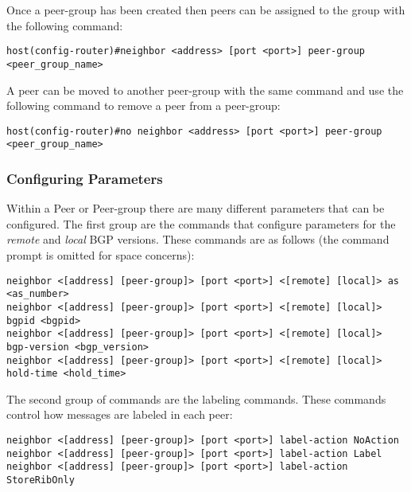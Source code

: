 Once a peer-group has been created then peers can be assigned to the group with the following command:\\

\begin{Verbatim}[frame=single]
host(config-router)#neighbor <address> [port <port>] peer-group <peer_group_name>
\end{Verbatim}

A peer can be moved to another peer-group with the same command and use the following command to remove a peer from a peer-group:\\

\begin{Verbatim}[frame=single]
host(config-router)#no neighbor <address> [port <port>] peer-group <peer_group_name>
\end{Verbatim}

\subsubsection{Configuring Parameters}
\label{sec:configure:peers:configureparameters}

Within a Peer or Peer-group there are many different parameters that can be configured.  The first group are the commands that configure parameters for the \emph{remote} and \emph{local} BGP versions.  These commands are as follows (the command prompt is omitted for space concerns):\\

\small{
\begin{Verbatim}[frame=single]
neighbor <[address] [peer-group]> [port <port>] <[remote] [local]> as <as_number>
neighbor <[address] [peer-group]> [port <port>] <[remote] [local]> bgpid <bgpid>
neighbor <[address] [peer-group]> [port <port>] <[remote] [local]> bgp-version <bgp_version>
neighbor <[address] [peer-group]> [port <port>] <[remote] [local]> hold-time <hold_time>
\end{Verbatim}
}

The second group of commands are the labeling commands.  These commands control how messages are labeled in each peer:\\

\begin{Verbatim}[frame=single]
neighbor <[address] [peer-group]> [port <port>] label-action NoAction
neighbor <[address] [peer-group]> [port <port>] label-action Label
neighbor <[address] [peer-group]> [port <port>] label-action StoreRibOnly
\end{Verbatim}

